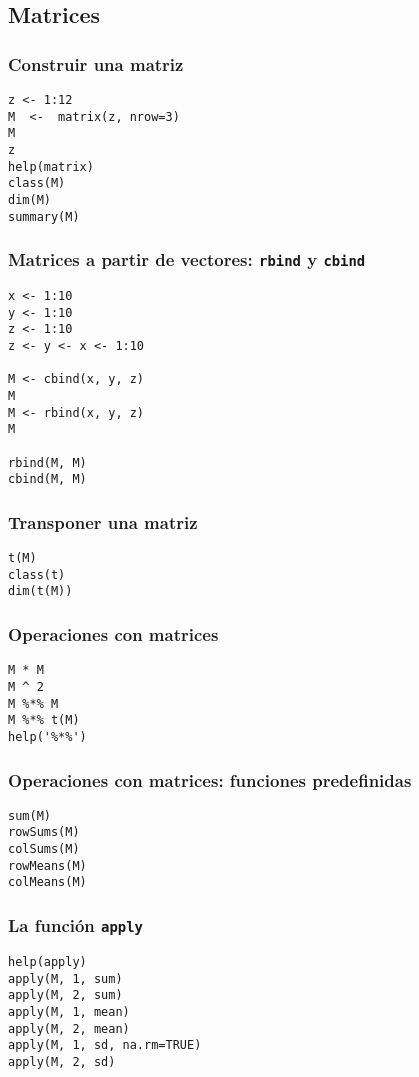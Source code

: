 \documentclass[xcolor={usenames,svgnames,dvipsnames}]{beamer}
\begin{document}
\subsection{Matrices}
\label{sec-2-2}
\begin{frame}[fragile]
\frametitle{Construir una matriz}
\label{sec-2-2-1}


\lstset{language=R}
\begin{lstlisting}
z <- 1:12
M  <-  matrix(z, nrow=3)
M
z
help(matrix)
class(M)
dim(M)
summary(M)
\end{lstlisting}
\end{frame}
\begin{frame}[fragile]
\frametitle{Matrices a partir de vectores: \texttt{rbind} y \texttt{cbind}}
\label{sec-2-2-2}


\lstset{language=R}
\begin{lstlisting}
x <- 1:10
y <- 1:10
z <- 1:10
z <- y <- x <- 1:10

M <- cbind(x, y, z)
M
M <- rbind(x, y, z)
M

rbind(M, M)
cbind(M, M)
\end{lstlisting}
\end{frame}
\begin{frame}[fragile]
\frametitle{Transponer una matriz}
\label{sec-2-2-3}



\lstset{language=R}
\begin{lstlisting}
t(M)
class(t)
dim(t(M))
\end{lstlisting}
\end{frame}
\begin{frame}[fragile]
\frametitle{Operaciones con matrices}
\label{sec-2-2-4}



\lstset{language=R}
\begin{lstlisting}
M * M
M ^ 2
M %*% M
M %*% t(M)
help('%*%')
\end{lstlisting}
\end{frame}
\begin{frame}[fragile]
\frametitle{Operaciones con matrices: funciones predefinidas}
\label{sec-2-2-5}



\lstset{language=R}
\begin{lstlisting}
sum(M)
rowSums(M)
colSums(M)
rowMeans(M)
colMeans(M)
\end{lstlisting}
\end{frame}
\begin{frame}[fragile]
\frametitle{La función \texttt{apply}}
\label{sec-2-2-6}


\lstset{language=R}
\begin{lstlisting}
help(apply)
apply(M, 1, sum)
apply(M, 2, sum)
apply(M, 1, mean)
apply(M, 2, mean)
apply(M, 1, sd, na.rm=TRUE)
apply(M, 2, sd)
\end{lstlisting}
\end{frame}
\end{document}
